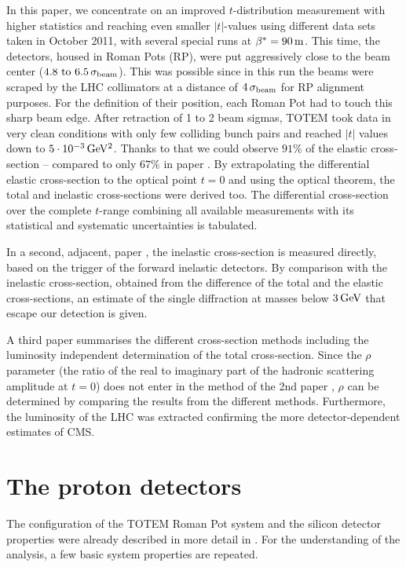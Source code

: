 \documentclass[doublecol]{../macros/epl2}
\def\un#1{\,{\rm #1}}
\begin{document}
In this paper, we concentrate on an improved $t$-distribution measurement with higher statistics and reaching even smaller $|t|$-values using different data sets taken in October 2011, with several special runs at $\beta^* = 90\un{m}$. This time, the detectors, housed in Roman Pots (RP), were put aggressively close to the beam center ($4.8 \hbox{ to } 6.5\, \sigma_{\rm beam}$). This was possible since in this run the beams were scraped by the LHC collimators at a distance of $4\,\sigma_{\rm beam}$ for RP alignment purposes. For the definition of their position, each Roman Pot had to touch this sharp beam edge. After retraction of 1 to 2 beam sigmas, TOTEM took data in very clean conditions with only few colliding bunch pairs and reached $|t|$ values down to $5\cdot10^{-3}\un{GeV^2}$. Thanks to that we could observe $91\%$ of the elastic cross-section -- compared to only $67\%$ in paper \cite{epl96}. By extrapolating the differential elastic cross-section to the optical point $t=0$ and using the optical theorem, the total and inelastic cross-sections were derived too. The differential cross-section over the complete $t$-range combining all available measurements with its statistical and systematic uncertainties is tabulated.

In a second, adjacent, paper \cite{P2}, the inelastic cross-section is measured directly, based on the trigger of the forward inelastic detectors. By comparison with the inelastic cross-section, obtained from the difference of the total and the elastic cross-sections, an estimate of the single diffraction at masses below $3\un{GeV}$ that escape our detection is given.

A third paper \cite{P3} summarises the different cross-section methods including the luminosity independent determination of the total cross-section. Since the $\rho$ parameter (the ratio of the real to imaginary part of the hadronic scattering amplitude at $t=0$) does not enter in the method of the 2nd paper \cite{P2}, $\rho$ can be determined by comparing the results from the different methods. Furthermore, the luminosity of the LHC was extracted confirming the more detector-dependent estimates of CMS. 



\section{The proton detectors}

The configuration of the TOTEM Roman Pot system and the silicon detector properties were already described in more detail in \cite{jinst,epl95,epl96}. For the understanding of the analysis, a few basic  system  properties are repeated. 
\end{document}
